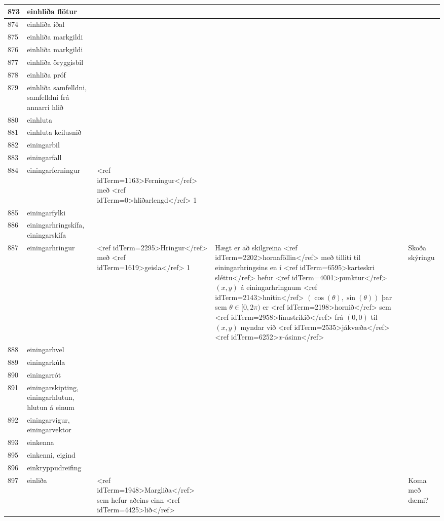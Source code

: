 \begin{longtable}{p{}|p{}|p{}|p{}|p{}}
\hline
873 & einhliða flötur &  &  &  \\
\hline
874 & einhliða íðal &  &  &  \\
\hline
875 & einhliða markgildi &  &  &  \\
\hline
876 & einhliða markgildi &  &  &  \\
\hline
877 & einhliða öryggisbil &  &  &  \\
\hline
878 & einhliða próf &  &  &  \\
\hline
879 & einhliða samfelldni, samfelldni frá annarri hlið &  &  &  \\
\hline
880 & einhluta &  &  &  \\
\hline
881 & einhluta keilusnið &  &  &  \\
\hline
882 & einingarbil &  &  &  \\
\hline
883 & einingarfall &  &  &  \\
\hline
884 & einingarferningur & <ref idTerm=1163>Ferningur</ref> með <ref idTerm=0>hliðarlengd</ref> 1 &  &  \\
\hline
885 & einingarfylki &  &  &  \\
\hline
886 & einingarhringskífa, einingarskífa &  &  &  \\
\hline
887 & einingarhringur & <ref idTerm=2295>Hringur</ref> með <ref idTerm=1619>geisla</ref> 1 & Hægt er að skilgreina <ref idTerm=2202>hornaföllin</ref> með tilliti til einingarhringsins en í <ref idTerm=6595>karteskri sléttu</ref> hefur <ref idTerm=4001>punktur</ref> $(x,y)$ á einingarhringnum <ref idTerm=2143>hnitin</ref> $(\cos(\theta),\sin(\theta))$ þar sem $\theta\in[0,2\pi)$ er <ref idTerm=2198>hornið</ref> sem <ref idTerm=2958>línustrikið</ref> frá $(0,0)$ til $(x,y)$ myndar við <ref idTerm=2535>jákvæða</ref> <ref idTerm=6252>$x$-ásinn</ref> & Skoða skýringu \\
\hline
888 & einingarhvel &  &  &  \\
\hline
889 & einingarkúla &  &  &  \\
\hline
890 & einingarrót &  &  &  \\
\hline
891 & einingarskipting, einingarhlutun, hlutun á einum &  &  &  \\
\hline
892 & einingarvigur, einingarvektor &  &  &  \\
\hline
893 & einkenna &  &  &  \\
\hline
895 & einkenni, eigind &  &  &  \\
\hline
896 & einkryppudreifing &  &  &  \\
\hline
897 & einliða & <ref idTerm=1948>Margliða</ref> sem hefur aðeins einn <ref idTerm=4425>lið</ref> &  & Koma með dæmi? \\

\end{longtable}

